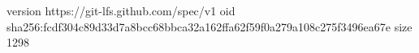 version https://git-lfs.github.com/spec/v1
oid sha256:fcdf304c89d33d7a8bcc68bbca32a162ffa62f59f0a279a108c275f3496ea67e
size 1298
